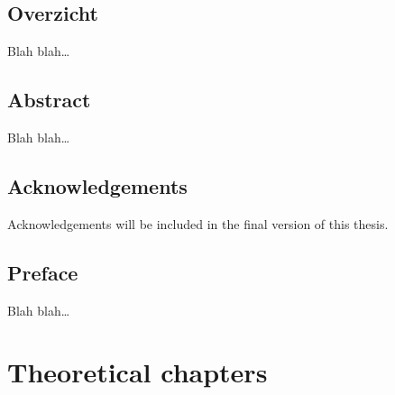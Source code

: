 \documentclass[a4paper,12pt,oneside,oldfontcommands]{memoir}
\newcommand{\initial}[1]{
	\lettrine[lines=3,lhang=0.33,nindent=0em]{
		\color{gray}
     		{\textsc{#1}}}{}}
\newcommand\blankpage{%
    \null
    \thispagestyle{empty}%
    \newpage}
\begin{document}
\afterpage{\blankpage}

\chapter*{Overzicht}

\initial{B}lah blah\ldots{}

\afterpage{\blankpage}

\chapter*{Abstract}

\initial{B}lah blah\ldots{}

\afterpage{\blankpage}

\chapter*{Acknowledgements}

\initial{A}cknowledgements will be included in the final version of this
thesis.

\afterpage{\blankpage}

\chapter*{Preface}

\initial{B}lah blah\ldots{}

\newpage

\blankpage

\renewcommand{\contentsname}{Table of contents}

 \tableofcontents*
{}
\newpage

\listoftables
{}
\newpage

\listoffigures
{}
\newpage


\part{Theoretical chapters}\label{part-theoretical-chapters}
\end{document}
